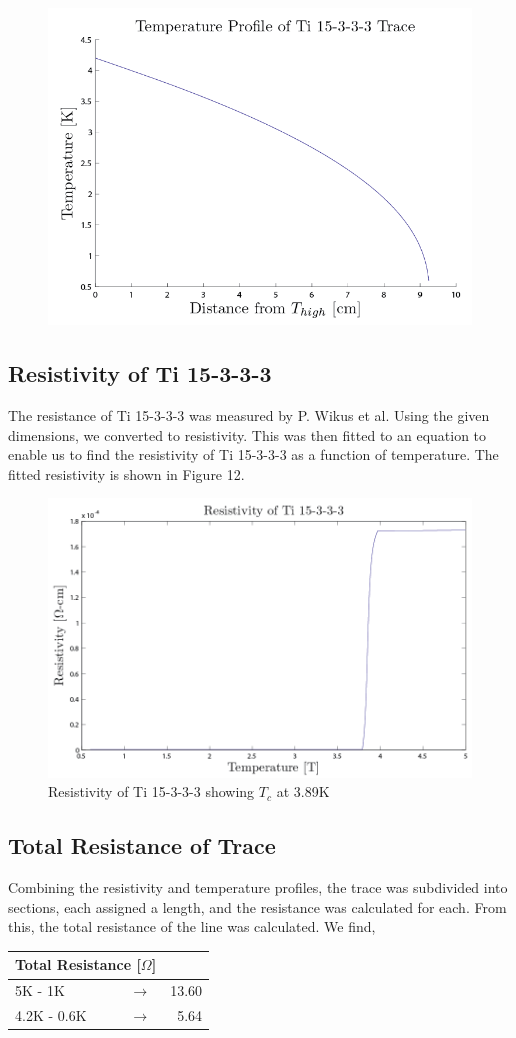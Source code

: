 \documentclass{report}
\begin{document}
\begin{figure}[h]
\centering
\includegraphics[width = .5\textwidth]{Ti153_T_Profile.png}
\caption{}
\end{figure}

\subsection{Resistivity of Ti 15-3-3-3}
The resistance of Ti 15-3-3-3 was measured by P. Wikus et al. Using the given dimensions, we converted to resistivity. This was then fitted to an equation to enable us to find the resistivity of Ti 15-3-3-3 as a function of temperature. The fitted resistivity is shown in Figure 12.

\begin{figure}[h]
\centering
\includegraphics[width = .6\textwidth]{Ti_Resistivity.png}
\caption{Resistivity of Ti 15-3-3-3 showing $T_c$ at 3.89K}
\end{figure}

\subsection{Total Resistance of Trace}

Combining the resistivity and temperature profiles, the trace was subdivided into sections, each assigned a length, and the resistance was calculated for each. From this, the total resistance of the line was calculated. We find,

\begin{table}[h]
\begin{threeparttable}
\begin{tabular}{lcr}
\toprule
\multicolumn{2}{r}{Total Resistance [$\Omega$]} \\
\midrule
5K - 1K & $\rightarrow$ & 13.60 \\
4.2K - 0.6K & $\rightarrow$ & 5.64 \\
\bottomrule
\end{tabular}
\end{threeparttable}
\end{table}
\end{document}
